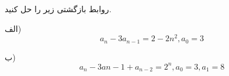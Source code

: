 \exercise
روابط بازگشتی زیر را حل کنید.

الف)
$$a_n - 3a_{n-1} = 2 - 2n^2, a_0 = 3$$


ب)
$$a_n - 3a{n-1} + a_{n-2} = 2^n, a_0 = 3, a_1 = 8$$
